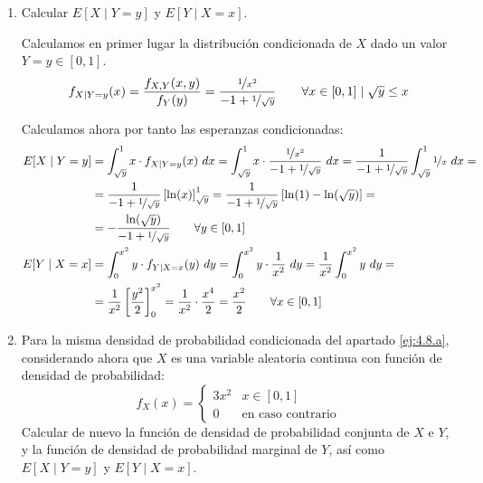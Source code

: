 \begin{ejercicio}
\begin{enumerate}
        \item Calcular $E[X\mid Y = y]$ y $E[Y\mid X = x]$.
        
        Calculamos en primer lugar la distribución condicionada de $X$ dado un valor $Y = y\in [0,1]$.
        \begin{equation*}
            f_{X\mid Y=y}(x) = \dfrac{f_{X,Y}(x,y)}{f_Y(y)}
            = \dfrac{\nicefrac{1}{x^2}}{-1 + \nicefrac{1}{\sqrt{y}}}
            \qquad \forall x\in[0,1] \mid \sqrt{y}\leq x
        \end{equation*}

        Calculamos ahora por tanto las esperanzas condicionadas:
        \begin{align*}
            E[X\mid Y = y] &= \int_{\sqrt{y}}^{1} x\cdot f_{X\mid Y=y}(x) \ dx
            = \int_{\sqrt{y}}^{1} x\cdot \dfrac{\nicefrac{1}{x^2}}{-1 + \nicefrac{1}{\sqrt{y}}} \ dx
            = \dfrac{1}{-1 + \nicefrac{1}{\sqrt{y}}}\int_{\sqrt{y}}^{1} \nicefrac{1}{x} \ dx
            =\\&= \dfrac{1}{-1 + \nicefrac{1}{\sqrt{y}}}\left[\ln(x)\right]_{\sqrt{y}}^{1}
            = \dfrac{1}{-1 + \nicefrac{1}{\sqrt{y}}}\left[\ln(1) - \ln(\sqrt{y})\right]
            =\\&= -\dfrac{\ln(\sqrt{y})}{-1 + \nicefrac{1}{\sqrt{y}}} \qquad\forall y\in[0,1]\\
            E[Y\mid X = x] &= \int_{0}^{x^2} y\cdot f_{Y\mid X=x}(y) \ dy
            = \int_{0}^{x^2} y\cdot \frac{1}{x^2} \ dy
            = \frac{1}{x^2}\int_{0}^{x^2} y \ dy
            =\\&= \frac{1}{x^2}\left[\frac{y^2}{2}\right]_{0}^{x^2}
            = \frac{1}{x^2}\cdot \frac{x^4}{2}
            = \frac{x^2}{2} \qquad \forall x\in[0,1]
        \end{align*}

        
        \item Para la misma densidad de probabilidad condicionada del apartado \ref{ej:4.8.a}, considerando ahora que $X$ es una variable aleatoria continua con función de densidad de probabilidad:
        \begin{equation*}
            f_X(x) = \begin{cases}
                3x^2 & x \in \left[0,1\right]\\
                0 & \text{en caso contrario}
            \end{cases}
        \end{equation*}
        Calcular de nuevo la función de densidad de probabilidad conjunta de $X$ e $Y$, y la función de densidad de probabilidad marginal de $Y$, así como $E[X\mid Y = y]$ y $E[Y\mid X = x]$.\\


\end{enumerate}
\end{ejercicio}
